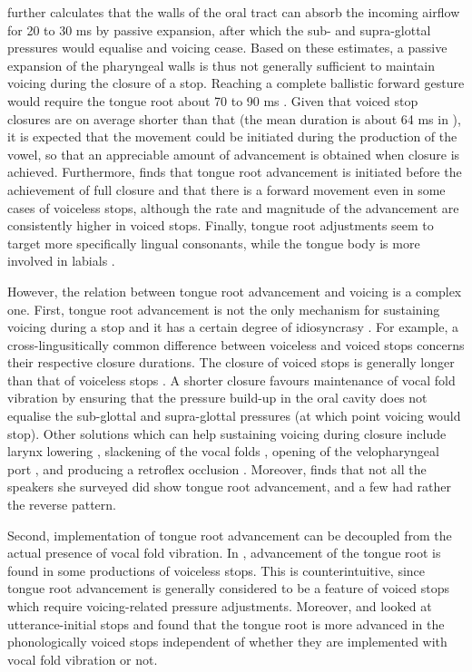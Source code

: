 \documentclass[12pt,]{article}
\begin{document}
\citet{rothenberg1967} further calculates that the walls of the oral
tract can absorb the incoming airflow for 20 to 30 ms by passive
expansion, after which the sub- and supra-glottal pressures would
equalise and voicing cease. Based on these estimates, a passive
expansion of the pharyngeal walls is thus not generally sufficient to
maintain voicing during the closure of a stop. Reaching a complete
ballistic forward gesture would require the tongue root about 70 to 90
ms \citep{rothenberg1967}. Given that voiced stop closures are on
average shorter than that (the mean duration is about 64 ms in
\citealt{luce1985}), it is expected that the movement could be initiated
during the production of the vowel, so that an appreciable amount of
advancement is obtained when closure is achieved. Furthermore,
\citet{westbury1983} finds that tongue root advancement is initiated
before the achievement of full closure and that there is a forward
movement even in some cases of voiceless stops, although the rate and
magnitude of the advancement are consistently higher in voiced stops.
Finally, tongue root adjustments seem to target more specifically
lingual consonants, while the tongue body is more involved in labials
\citep{perkell1969, westbury1983}.

However, the relation between tongue root advancement and voicing is a
complex one. First, tongue root advancement is not the only mechanism
for sustaining voicing during a stop
\citep{rothenberg1967, westbury1983, ohala2011} and it has a certain
degree of idiosyncrasy \citep{ahn2018}. For example, a
cross-lingusitically common difference between voiceless and voiced
stops concerns their respective closure durations. The closure of voiced
stops is generally longer than that of voiceless stops
\citep{lisker1957, umeda1977, van-summers1987, davis1989, de-jong1991}.
A shorter closure favours maintenance of vocal fold vibration by
ensuring that the pressure build-up in the oral cavity does not equalise
the sub-glottal and supra-glottal pressures (at which point voicing
would stop). Other solutions which can help sustaining voicing during
closure include larynx lowering \citep{riordan1980}, slackening of the
vocal folds \citet{halle1967}, opening of the velopharyngeal port
\citep{yanagihara1966}, and producing a retroflex occlusion
\citep{sprouse2008}. Moreover, \citep{ahn2018} finds that not all the
speakers she surveyed did show tongue root advancement, and a few had
rather the reverse pattern.

Second, implementation of tongue root advancement can be decoupled from
the actual presence of vocal fold vibration. In \citet{westbury1983},
advancement of the tongue root is found in some productions of voiceless
stops. This is counterintuitive, since tongue root advancement is
generally considered to be a feature of voiced stops which require
voicing-related pressure adjustments. Moreover, \citet{ahn2015, ahn2018}
and \citet{ahn2016} looked at utterance-initial stops and found that the
tongue root is more advanced in the phonologically voiced stops
independent of whether they are implemented with vocal fold vibration or
not.
\end{document}
